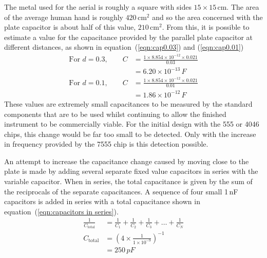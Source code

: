 The metal used for the aerial is roughly a square with sides $15\times 15\,\text{cm}$. The area of the average human hand is roughly $420\,\text{cm}^2$ and so the area concerned with the plate capacitor is about half of this value, $210\,\text{cm}^2$\cite{Joo-Young-Lee2007}. From this, it is possible to estimate a value for the capacitance provided by the parallel plate capacitor at different distances, as shown in equation~(\ref{eqn:cap0.03}) and (\ref{eqn:cap0.01})
\begin{align}
	\text{For } d = 0.3, \qquad C &= \frac{1\times 8.854\times 10^{-12} \times 0.021}{0.03} \label{eqn:cap0.03}\\
			&= 6.20\times 10^{-13}\,F \nonumber \\
	\text{For } d = 0.1, \qquad C &= \frac{1\times 8.854\times 10^{-12} \times 0.021}{0.01} \label{eqn:cap0.01}\\
			&= 1.86\times 10^{-12}\,F \nonumber
\end{align}
These values are extremely small capacitances to be measured by the standard components that are to be used whilst continuing to allow the finished instrument to be commercially viable. For the initial design with the 555 or 4046 chips, this change would be far too small to be detected. Only with the increase in frequency provided by the 7555 chip is this detection possible.

An attempt to increase the capacitance change caused by moving close to the plate is made by adding several separate fixed value capacitors in series with the variable capacitor. When in series, the total capacitance is given by the sum of the reciprocals of the separate capacitances. A sequence of four small 1\,nF capacitors is added in series with a total capacitance shown in equation~(\ref{eqn:capacitors in series}).
\begin{align}
	\frac{1}{C_\text{total}} &= \frac{1}{C_1}+\frac{1}{C_2}+\frac{1}{C_3}+\ldots+\frac{1}{C_N} \label{eqn:capacitors in series}\\
	C_\text{total} &= \left( 4\times \frac{1}{1\times 10^{-9}}\right)^{-1} \nonumber \\
	&= 250\,pF \nonumber
\end{align}

\newpage 
